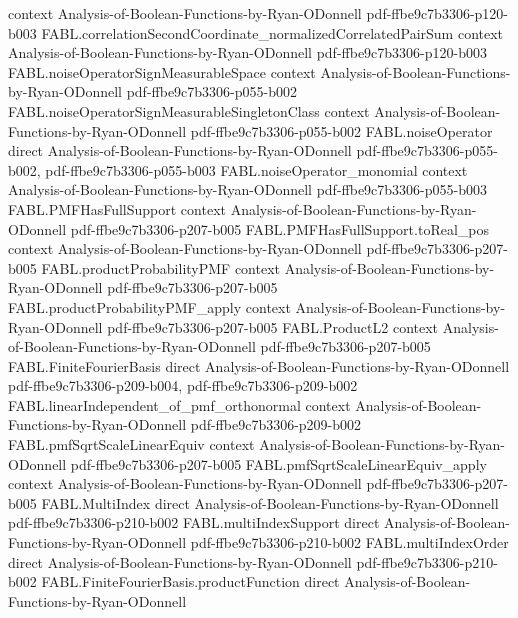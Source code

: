 \begin{theorem}
  {context}
  {Analysis-of-Boolean-Functions-by-Ryan-ODonnell}
  {pdf-ffbe9c7b3306-p120-b003}
\proofstep
  {FABL.correlationSecondCoordinate_normalizedCorrelatedPairSum}
  {context}
  {Analysis-of-Boolean-Functions-by-Ryan-ODonnell}
  {pdf-ffbe9c7b3306-p120-b003}
\proofstep
  {FABL.noiseOperatorSignMeasurableSpace}
  {context}
  {Analysis-of-Boolean-Functions-by-Ryan-ODonnell}
  {pdf-ffbe9c7b3306-p055-b002}
\proofstep
  {FABL.noiseOperatorSignMeasurableSingletonClass}
  {context}
  {Analysis-of-Boolean-Functions-by-Ryan-ODonnell}
  {pdf-ffbe9c7b3306-p055-b002}
\proofstep
  {FABL.noiseOperator}
  {direct}
  {Analysis-of-Boolean-Functions-by-Ryan-ODonnell}
  {pdf-ffbe9c7b3306-p055-b002,
    pdf-ffbe9c7b3306-p055-b003}
\proofstep
  {FABL.noiseOperator_monomial}
  {context}
  {Analysis-of-Boolean-Functions-by-Ryan-ODonnell}
  {pdf-ffbe9c7b3306-p055-b003}
\proofstep
  {FABL.PMFHasFullSupport}
  {context}
  {Analysis-of-Boolean-Functions-by-Ryan-ODonnell}
  {pdf-ffbe9c7b3306-p207-b005}
\proofstep
  {FABL.PMFHasFullSupport.toReal_pos}
  {context}
  {Analysis-of-Boolean-Functions-by-Ryan-ODonnell}
  {pdf-ffbe9c7b3306-p207-b005}
\proofstep
  {FABL.productProbabilityPMF}
  {context}
  {Analysis-of-Boolean-Functions-by-Ryan-ODonnell}
  {pdf-ffbe9c7b3306-p207-b005}
\proofstep
  {FABL.productProbabilityPMF_apply}
  {context}
  {Analysis-of-Boolean-Functions-by-Ryan-ODonnell}
  {pdf-ffbe9c7b3306-p207-b005}
\proofstep
  {FABL.ProductL2}
  {context}
  {Analysis-of-Boolean-Functions-by-Ryan-ODonnell}
  {pdf-ffbe9c7b3306-p207-b005}
\proofstep
  {FABL.FiniteFourierBasis}
  {direct}
  {Analysis-of-Boolean-Functions-by-Ryan-ODonnell}
  {pdf-ffbe9c7b3306-p209-b004,
    pdf-ffbe9c7b3306-p209-b002}
\proofstep
  {FABL.linearIndependent_of_pmf_orthonormal}
  {context}
  {Analysis-of-Boolean-Functions-by-Ryan-ODonnell}
  {pdf-ffbe9c7b3306-p209-b002}
\proofstep
  {FABL.pmfSqrtScaleLinearEquiv}
  {context}
  {Analysis-of-Boolean-Functions-by-Ryan-ODonnell}
  {pdf-ffbe9c7b3306-p207-b005}
\proofstep
  {FABL.pmfSqrtScaleLinearEquiv_apply}
  {context}
  {Analysis-of-Boolean-Functions-by-Ryan-ODonnell}
  {pdf-ffbe9c7b3306-p207-b005}
\proofstep
  {FABL.MultiIndex}
  {direct}
  {Analysis-of-Boolean-Functions-by-Ryan-ODonnell}
  {pdf-ffbe9c7b3306-p210-b002}
\proofstep
  {FABL.multiIndexSupport}
  {direct}
  {Analysis-of-Boolean-Functions-by-Ryan-ODonnell}
  {pdf-ffbe9c7b3306-p210-b002}
\proofstep
  {FABL.multiIndexOrder}
  {direct}
  {Analysis-of-Boolean-Functions-by-Ryan-ODonnell}
  {pdf-ffbe9c7b3306-p210-b002}
\proofstep
  {FABL.FiniteFourierBasis.productFunction}
  {direct}
  {Analysis-of-Boolean-Functions-by-Ryan-ODonnell}

\end{theorem}
